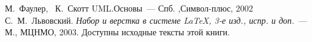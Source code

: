 ﻿
\begin{thebibliography}{2010}

М.~Фаулер, ~К.~Скотт UML.Основы~---
Спб. ,Символ-плюс, 2002
С.~М.~Львовский.
{\em Набор и верстка в системе \LaTeX, 3-е изд., испр. и доп.}~---
М., МЦНМО, 2003. Доступны исходные тексты этой книги.

\end{thebibliography}

\endinput
